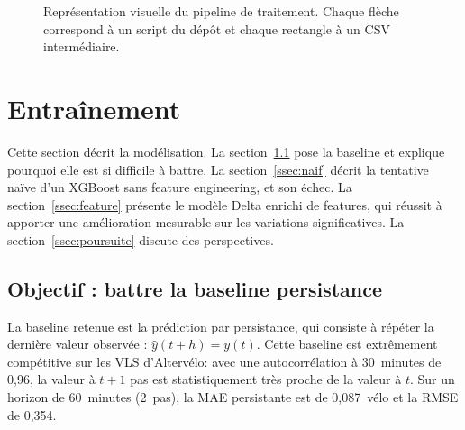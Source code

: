 \documentclass[fleqn, 12pt]{scrartcl}
\newcommand{\ent}{Altervélo\xspace}
\begin{document}
\begin{figure}[htp]
    \caption{Représentation visuelle du pipeline de traitement. Chaque flèche correspond à un script du dépôt et chaque rectangle à un CSV intermédiaire.}
    \label{fig:pipeline}
\end{figure}


\newpage

\section{Entraînement}
\label{sec:entrainement}

Cette section décrit la modélisation. La section~\ref{ssec:baseline} pose la baseline et explique pourquoi elle est si difficile à battre. La section~\ref{ssec:naif} décrit la tentative naïve d'un XGBoost sans feature engineering, et son échec. La section~\ref{ssec:feature} présente le modèle Delta enrichi de features, qui réussit à apporter une amélioration mesurable sur les variations significatives. La section~\ref{ssec:poursuite} discute des perspectives.


\subsection{Objectif : battre la baseline persistance}
\label{ssec:baseline}


\vspace{0.3cm}

La baseline retenue est la prédiction par persistance, qui consiste à répéter la dernière valeur observée : $\hat{y}(t+h) = y(t)$.
%
Cette baseline est extrêmement compétitive sur les VLS d'\ent : avec une autocorrélation à 30~minutes de 0{,}96, la valeur à $t+1$ pas est statistiquement très proche de la valeur à $t$. Sur un horizon de 60~minutes (2~pas), la MAE persistante est de 0{,}087~vélo et la RMSE de 0{,}354.

\vspace{0.3cm}
\end{document}
